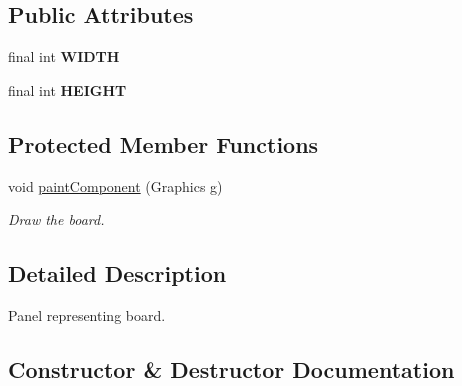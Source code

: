 \subsection*{Public Attributes}
\begin{DoxyCompactItemize}
\item 
final int {\bfseries W\+I\+D\+TH}\hypertarget{classGridPanel_a0ad964f4019fe73ca89797e3b2ba6801}{}\label{classGridPanel_a0ad964f4019fe73ca89797e3b2ba6801}

\item 
final int {\bfseries H\+E\+I\+G\+HT}\hypertarget{classGridPanel_a1a9b96aea68e7aa0b30ae9663760bb97}{}\label{classGridPanel_a1a9b96aea68e7aa0b30ae9663760bb97}

\end{DoxyCompactItemize}
\subsection*{Protected Member Functions}
\begin{DoxyCompactItemize}
\item 
void \hyperlink{classGridPanel_ae44d617ba15ff9b1778cc4c713151650}{paint\+Component} (Graphics g)\hypertarget{classGridPanel_ae44d617ba15ff9b1778cc4c713151650}{}\label{classGridPanel_ae44d617ba15ff9b1778cc4c713151650}

\begin{DoxyCompactList}\small\item\em Draw the board. \end{DoxyCompactList}\end{DoxyCompactItemize}


\subsection{Detailed Description}
Panel representing board. 

\subsection{Constructor \& Destructor Documentation}
